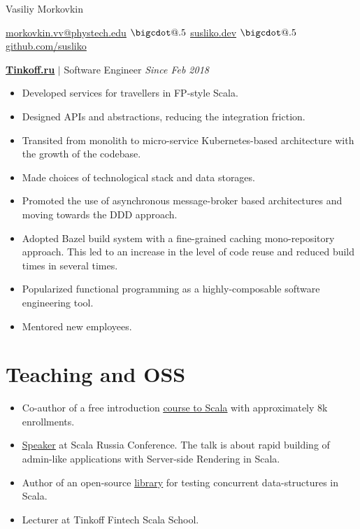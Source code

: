 \documentclass[paper=a4,fontsize=15pt]{scrartcl}
\makeatletter
\newcommand*\bigcdot{\mathpalette\bigcdot@{.5}}
\newcommand*\bigcdot@[2]{\mathbin{\vcenter{\hbox{\scalebox{#2}{$\m@th#1\bullet$}}}}}
\newcommand{\smolboispace}{\vspace*{0.1em}}
\newcommand{\halfspace}{\vspace*{0.5em}}
\newcommand{\bighalfspace}{\vspace*{0.75em}}
\newcommand{\http}[1]{\href{http://#1}{\ul{#1}}}
\newcommand{\https}[1]{\href{https://#1}{\ul{#1}}}
\newcommand{\email}[1]{\href{mailto:#1}{\ul{#1}}}
\makeatother
\begin{document}
\begin{center}
  {\fontsize{35}{40}\selectfont Vasiliy Morkovkin \par}
  \halfspace
  \smolboispace
  \smolboispace

  {\normalsize
    \email{morkovkin.vv@phystech.edu}
    $\bigcdot$ \http{susliko.dev}
    $\bigcdot$ \https{github.com/susliko}
    \par}
\end{center}

\bighalfspace
\normalsize
\noindent \href{https://www.tinkoff.ru}{\textbf{\ul{Tinkoff.ru}}}
$\vert$ \small Software Engineer
{\hfill \footnotesize \textit{Since Feb 2018}}
\begin{itemize}[noitemsep,leftmargin=20pt,label=\raisebox{0.25ex}{\tiny$\bullet$},topsep=5pt]
  \small
  \item Developed services for travellers in FP-style Scala.
  \item Designed APIs and abstractions, reducing the integration friction.
  \item Transited from monolith to micro-service Kubernetes-based architecture with the growth of the codebase.
  \item Made choices of technological stack and data storages.
  \item Promoted the use of asynchronous message-broker based architectures and moving towards the DDD approach.
  \item Adopted Bazel build system with a fine-grained caching mono-repository approach. This led to an increase in the level of code reuse and reduced build times in several times.
  \item Popularized functional programming as a highly-composable software engineering tool.
  \item Mentored new employees.
\end{itemize}

\section*{Teaching and OSS}{}
\begin{itemize}[noitemsep,leftmargin=20pt,label=\raisebox{0.25ex}{\tiny$\bullet$},topsep=5pt]
  \item Co-author of a free introduction \href{https://stepik.org/course/16243}{\ul{course to Scala}} with approximately 8k enrollments.
  \item \href{https://www.youtube.com/watch?v=8KxWi0xuDKs&t=15s}{\ul{Speaker}} at Scala Russia Conference. The talk is about rapid building of admin-like applications with Server-side Rendering in Scala.
  \item Author of an open-source \href{https://github.com/susliko/lotos}{\ul{library}} for testing concurrent data-structures in Scala.
  \item Lecturer at Tinkoff Fintech Scala School.
\end{itemize}
\end{document}

